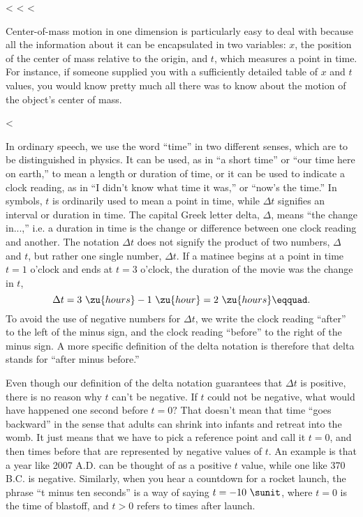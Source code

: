   <%
<%
<%

Center-of-mass motion in one dimension is particularly easy
to deal with because all the information about it can be
encapsulated in two variables: $x$, the position of the
center of mass relative to the origin, and $t$, which
measures a point in time. For instance, if someone supplied
you with a sufficiently detailed table of $x$ and $t$
values, you would know pretty much all there was to know
about the motion of the object's center of mass.

  <%

In ordinary speech, we use the word ``time'' in two
different senses, which are to be distinguished in physics.
It can be used, as in ``a short time'' or ``our time here on
earth,'' to mean a length or duration of time, or it can be
used to indicate a clock reading, as in ``I didn't know what
time it was,'' or ``now's the time.'' In symbols, $t$ is
ordinarily used to mean a point in time, while $\Delta t$
signifies an interval or duration in time. The capital Greek
letter delta, $\Delta $, means ``the change in...,'' i.e. a
duration in time is the change or difference between one
clock reading and another. The notation $\Delta t$ does not
signify the product of two numbers, $\Delta $ and $t$, but
rather one single number, $\Delta t$. If a matinee begins at
a point in time $t=1$ o'clock and ends at $t=3$ o'clock, the
duration of the movie was the change in $t$,
\begin{equation*}
     \Delta t=3\ \zu{hours} - 1\ \zu{hour} =  2\ \zu{hours}\eqquad.
\end{equation*}
To avoid the use of negative numbers for $\Delta t$, we
write the clock reading ``after'' to the left of the minus
sign, and the clock reading ``before'' to the right of the
minus sign. A more specific definition of the delta notation is therefore that delta stands for
``after minus before.''

Even though our definition of the delta notation guarantees
that $\Delta t$ is positive, there is no reason why $t$
can't be negative. If $t$ could not be negative, what would
have happened one second before $t=0?$ That doesn't mean
that time ``goes backward'' in the sense that adults can
shrink into infants and retreat into the womb. It just means
that we have to pick a reference point and call it $t=0$,
and then times before that are represented by negative values of $t$.
An example is that a year like 2007 A.D. can be thought of as a positive
$t$ value, while one like 370 B.C. is negative. Similarly, when you
hear a countdown for a rocket launch, the phrase ``t minus ten seconds''
is a way of saying $t=-10\ \sunit$, where $t=0$ is the time of blastoff,
and $t>0$ refers to times after launch.

